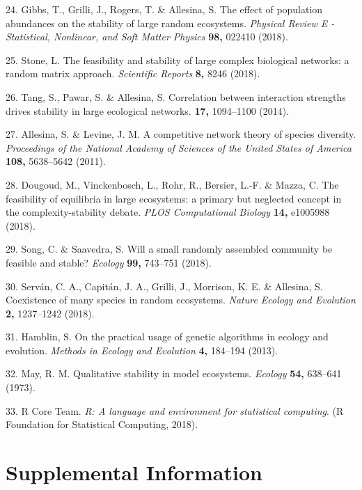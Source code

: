 \documentclass[]{article}
\begin{document}
\hypertarget{ref-Gibbs2017}{}
24. Gibbs, T., Grilli, J., Rogers, T. \& Allesina, S. The effect of
population abundances on the stability of large random ecosystems.
\emph{Physical Review E - Statistical, Nonlinear, and Soft Matter
Physics} \textbf{98,} 022410 (2018).

\hypertarget{ref-Stone2017}{}
25. Stone, L. The feasibility and stability of large complex biological
networks: a random matrix approach. \emph{Scientific Reports}
\textbf{8,} 8246 (2018).

\hypertarget{ref-Tang2014c}{}
26. Tang, S., Pawar, S. \& Allesina, S. Correlation between interaction
strengths drives stability in large ecological networks. \textbf{17,}
1094--1100 (2014).

\hypertarget{ref-Allesina2011}{}
27. Allesina, S. \& Levine, J. M. A competitive network theory of
species diversity. \emph{Proceedings of the National Academy of Sciences
of the United States of America} \textbf{108,} 5638--5642 (2011).

\hypertarget{ref-Dougoud2018}{}
28. Dougoud, M., Vinckenbosch, L., Rohr, R., Bersier, L.-F. \& Mazza, C.
The feasibility of equilibria in large ecosystems: a primary but
neglected concept in the complexity-stability debate. \emph{PLOS
Computational Biology} \textbf{14,} e1005988 (2018).

\hypertarget{ref-Song2018}{}
29. Song, C. \& Saavedra, S. Will a small randomly assembled community
be feasible and stable? \emph{Ecology} \textbf{99,} 743--751 (2018).

\hypertarget{ref-Servan2018}{}
30. Serván, C. A., Capitán, J. A., Grilli, J., Morrison, K. E. \&
Allesina, S. Coexistence of many species in random ecosystems.
\emph{Nature Ecology and Evolution} \textbf{2,} 1237--1242 (2018).

\hypertarget{ref-Hamblin2013}{}
31. Hamblin, S. On the practical usage of genetic algorithms in ecology
and evolution. \emph{Methods in Ecology and Evolution} \textbf{4,}
184--194 (2013).

\hypertarget{ref-May1973}{}
32. May, R. M. Qualitative stability in model ecosystems. \emph{Ecology}
\textbf{54,} 638--641 (1973).

\hypertarget{ref-Rproject}{}
33. R Core Team. \emph{R: A language and environment for statistical
computing}. (R Foundation for Statistical Computing, 2018).

\clearpage




\section{Supplemental Information}
\end{document}
